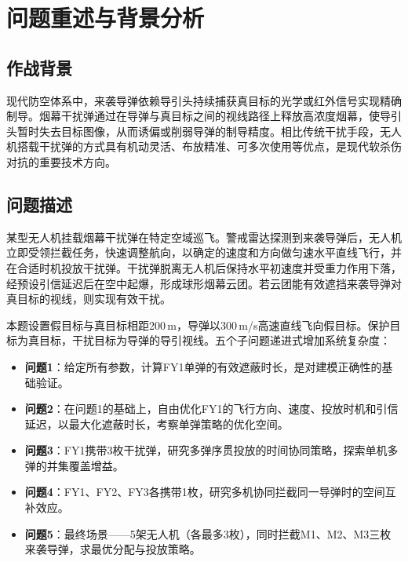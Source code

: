 \documentclass[12pt, a4paper]{article}
\begin{document}
\newpage
\tableofcontents
\newpage

\section{问题重述与背景分析}

\subsection{作战背景}

现代防空体系中，来袭导弹依赖导引头持续捕获真目标的光学或红外信号实现精确制导。烟幕干扰弹通过在导弹与真目标之间的视线路径上释放高浓度烟幕，使导引头暂时失去目标图像，从而诱偏或削弱导弹的制导精度。相比传统干扰手段，无人机搭载干扰弹的方式具有机动灵活、布放精准、可多次使用等优点，是现代软杀伤对抗的重要技术方向。

\subsection{问题描述}

某型无人机挂载烟幕干扰弹在特定空域巡飞。警戒雷达探测到来袭导弹后，无人机立即受领拦截任务，快速调整航向，以确定的速度和方向做匀速水平直线飞行，并在合适时机投放干扰弹。干扰弹脱离无人机后保持水平初速度并受重力作用下落，经预设引信延迟后在空中起爆，形成球形烟幕云团。若云团能有效遮挡来袭导弹对真目标的视线，则实现有效干扰。

本题设置假目标与真目标相距200\,m，导弹以300\,m/s高速直线飞向假目标。保护目标为真目标，干扰目标为导弹的导引视线。五个子问题递进式增加系统复杂度：

\begin{itemize}[leftmargin=2em]
  \item \textbf{问题1}：给定所有参数，计算FY1单弹的有效遮蔽时长，是对建模正确性的基础验证。
  \item \textbf{问题2}：在问题1的基础上，自由优化FY1的飞行方向、速度、投放时机和引信延迟，以最大化遮蔽时长，考察单弹策略的优化空间。
  \item \textbf{问题3}：FY1携带3枚干扰弹，研究多弹序贯投放的时间协同策略，探索单机多弹的并集覆盖增益。
  \item \textbf{问题4}：FY1、FY2、FY3各携带1枚，研究多机协同拦截同一导弹时的空间互补效应。
  \item \textbf{问题5}：最终场景——5架无人机（各最多3枚），同时拦截M1、M2、M3三枚来袭导弹，求最优分配与投放策略。
\end{itemize}
\end{document}
